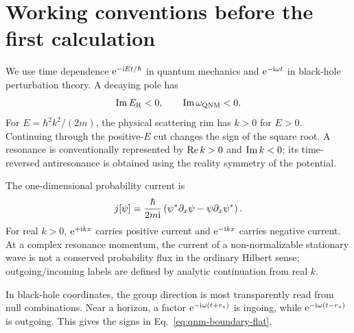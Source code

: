 \section{Working conventions before the first calculation}
\label{app:conventions}

We use time dependence $\mathrm{e}^{-\mathrm{i} Et/\hbar}$ in quantum mechanics and
$\mathrm{e}^{-\mathrm{i}\omega t}$ in black-hole perturbation theory.  A decaying pole has
\begin{equation}
  \operatorname{Im} E_{\mathrm{R}}<0,
  \qquad
  \operatorname{Im}\omega_{\mathrm{QNM}}<0 .
  \label{eq:app-decay-signs}
\end{equation}
For $E=\hbar^2k^2/(2m)$, the physical scattering rim has $k>0$ for
$E>0$.  Continuing through the positive-$E$ cut changes the sign of the square
root.  A resonance is conventionally represented by $\operatorname{Re} k>0$ and
$\operatorname{Im} k<0$; its time-reversed antiresonance is obtained using the reality
symmetry of the potential.

The one-dimensional probability current is
\begin{equation}
  j[\psi]
  =\frac{\hbar}{2m\mathrm{i}}
  \left(\psi^*\partial_x\psi
  -\psi\partial_x\psi^*\right) .
  \label{eq:probability-current}
\end{equation}
For real $k>0$, $\mathrm{e}^{+\mathrm{i} kx}$ carries positive current and
$\mathrm{e}^{-\mathrm{i} kx}$ carries negative current.  At a complex resonance momentum,
the current of a non-normalizable stationary wave is not a conserved
probability flux in the ordinary Hilbert sense; outgoing/incoming labels are
defined by analytic continuation from real $k$.

In black-hole coordinates, the group direction is most transparently read
from null combinations.  Near a horizon, a factor
$\mathrm{e}^{-\mathrm{i}\omega(t+r_*)}$ is ingoing, while
$\mathrm{e}^{-\mathrm{i}\omega(t-r_*)}$ is outgoing.  This gives the signs in
Eq.~\eqref{eq:qnm-boundary-flat}.
